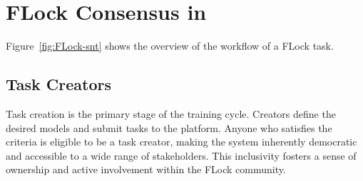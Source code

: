 \documentclass[conference]{IEEEtran}
\begin{document}
    









\section{FLock Consensus in \SNT }


Figure~\ref{fig:FLock-snt} shows the overview of the workflow of a FLock \SNT task.

\subsection{Task Creators}

Task creation is the primary stage of the training cycle. Creators define the desired models and submit tasks to the platform. Anyone who satisfies the criteria is eligible to be a task creator, making the system inherently democratic and accessible to a wide range of stakeholders. This inclusivity fosters a sense of ownership and active involvement within the FLock community.
\end{document}
